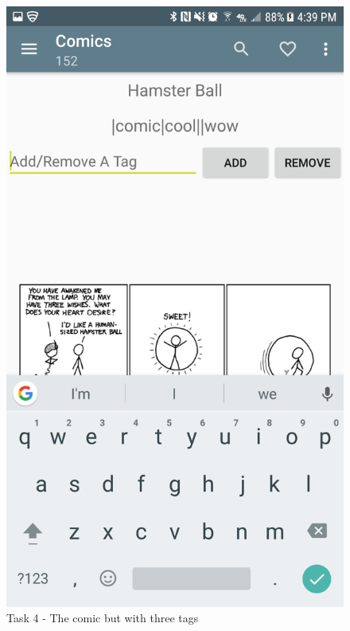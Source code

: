 \documentclass{article}
\makeatletter
\def\maxwidth#1{\ifdim\Gin@nat@width>#1 #1\else\Gin@nat@width\fi}
\makeatother
\begin{document}
	\begin{figure}[ht]
		\includegraphics[width=\maxwidth{3in}]{img/t4s2.png}
		\centering
        \caption{Task 4 - The comic but with three tags}
	\end{figure}
\end{document}
